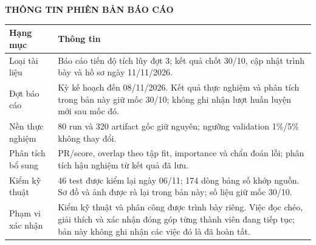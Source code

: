 \documentclass[12pt,a4paper,oneside]{report}
\begin{document}
\thispagestyle{empty}
\vspace*{-1.05cm}
\begin{center}{\bfseries\fontsize{16pt}{20pt}\selectfont\color{HCMUTEDark} THÔNG TIN PHIÊN BẢN BÁO CÁO}\end{center}
\vspace{0.25cm}
\begingroup\fontsize{10.5pt}{13pt}\selectfont\renewcommand{\arraystretch}{1.5}
\begin{tabularx}{\textwidth}{L{4.2cm}Y}\toprule
\textbf{Hạng mục} & \textbf{Thông tin}\\\midrule
Loại tài liệu & Báo cáo tiến độ tích lũy đợt 3; kết quả chốt 30/10, cập nhật trình bày và hồ sơ ngày 11/11/2026.\\
Đợt báo cáo & Kỳ kế hoạch đến 08/11/2026. Kết quả thực nghiệm và phân tích trong bản này giữ mốc 30/10; không ghi nhận lượt huấn luyện mới sau mốc đó.\\
Nền thực nghiệm & 80 run và 320 artifact gốc giữ nguyên; ngưỡng validation 1\%/5\% không thay đổi.\\
Phân tích bổ sung & PR/score, overlap theo tập fit, importance và chẩn đoán lỗi; phân tích hậu nghiệm từ kết quả đã lưu.\\
Kiểm kỹ thuật & 46 test được kiểm lại ngày 06/11; 174 dòng bảng số khớp nguồn. Sơ đồ và ảnh được rà lại trong bản này; số liệu giữ mốc 30/10.\\
Phạm vi xác nhận & Kiểm kỹ thuật và phân công được trình bày riêng. Việc đọc chéo, giải thích và xác nhận đóng góp từng thành viên đang tiếp tục; bản này không ghi nhận các việc đó là đã hoàn tất.\\
\bottomrule\end{tabularx}\endgroup
\vspace{0.35cm}
\par
\clearpage
{}
\setcounter{page}{1}
\begingroup\fontsize{10pt}{12pt}\selectfont{}\tableofcontents\endgroup
\clearpage
{}
\begingroup\fontsize{10pt}{12pt}\selectfont{}
\par\vspace{0.45cm}
\makeatletter{}\makeatother
\endgroup\clearpage
{}
\begingroup\fontsize{10pt}{12pt}\selectfont{}
\par\vspace{0.45cm}
\makeatletter{}\makeatother
\endgroup\clearpage
\end{document}
